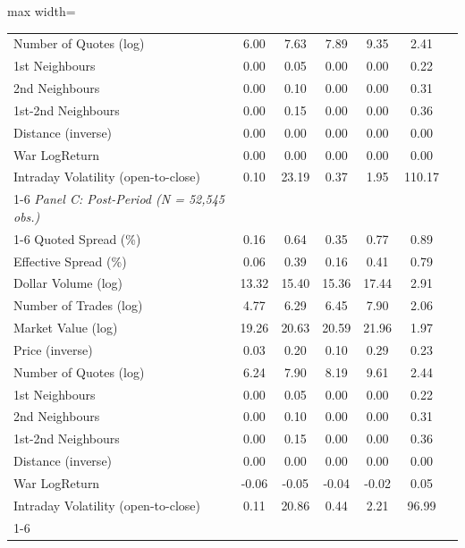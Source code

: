 \begin{table}[!htp]
\begin{adjustbox}{max width=\textwidth}
\begin{tabular}{lcccccc}
Number of Quotes (log) & 6.00 & 7.63 & 7.89 & 9.35 & 2.41 &  \\
1st Neighbours & 0.00 & 0.05 & 0.00 & 0.00 & 0.22 &  \\
2nd Neighbours & 0.00 & 0.10 & 0.00 & 0.00 & 0.31 &  \\
1st-2nd Neighbours & 0.00 & 0.15 & 0.00 & 0.00 & 0.36 &  \\
Distance (inverse) & 0.00 & 0.00 & 0.00 & 0.00 & 0.00 &  \\
War LogReturn & 0.00 & 0.00 & 0.00 & 0.00 & 0.00 &  \\
Intraday Volatility (open-to-close) & 0.10 & 23.19 & 0.37 & 1.95 & 110.17 &  \\
\cmidrule{1-6}
\textit{Panel C: Post-Period (N = 52,545 obs.)} \\
\cmidrule{1-6}
Quoted Spread (\%) & 0.16 & 0.64 & 0.35 & 0.77 & 0.89 &  \\
Effective Spread (\%) & 0.06 & 0.39 & 0.16 & 0.41 & 0.79 &  \\
Dollar Volume (log) & 13.32 & 15.40 & 15.36 & 17.44 & 2.91 &  \\
Number of Trades (log) & 4.77 & 6.29 & 6.45 & 7.90 & 2.06 &  \\
Market Value (log) & 19.26 & 20.63 & 20.59 & 21.96 & 1.97 &  \\
Price (inverse) & 0.03 & 0.20 & 0.10 & 0.29 & 0.23 &  \\
Number of Quotes (log) & 6.24 & 7.90 & 8.19 & 9.61 & 2.44 &  \\
1st Neighbours & 0.00 & 0.05 & 0.00 & 0.00 & 0.22 &  \\
2nd Neighbours & 0.00 & 0.10 & 0.00 & 0.00 & 0.31 &  \\
1st-2nd Neighbours & 0.00 & 0.15 & 0.00 & 0.00 & 0.36 &  \\
Distance (inverse) & 0.00 & 0.00 & 0.00 & 0.00 & 0.00 &  \\
War LogReturn & -0.06 & -0.05 & -0.04 & -0.02 & 0.05 &  \\
Intraday Volatility (open-to-close) & 0.11 & 20.86 & 0.44 & 2.21 & 96.99 &  \\
\cmidrule{1-6}
\end{tabular}
 \end{adjustbox}
 \end{table}
